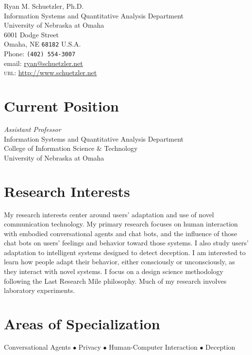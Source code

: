 \documentclass[10pt, letter]{article}
\begin{document}
{\LARGE Ryan M. Schuetzler, Ph.D.}\\[1cm]
 Information Systems and Quantitative Analysis Department\\
 University of Nebraska at Omaha\\
 6001 Dodge Street\\
 Omaha, NE \texttt{68182}
U.S.A.\\[.2cm]
Phone: \texttt{(402) 554-3007}\\[.2cm]
email: \href{mailto:ryan@schuetzler.net}{ryan@schuetzler.net}\\
\textsc{url}: \href{http://www.schuetzler.net}{http://www.schuetzler.net}\\

\section*{Current Position}
\emph{Assistant Professor}\\
Information Systems and Quantitative Analysis Department\\
College of Information Science \& Technology\\
University of Nebraska at Omaha


\section*{Research Interests}

My research interests center around users' adaptation and use of novel
communication technology. My primary research focuses on human interaction with
embodied conversational agents and chat bots, and the influence of those chat
bots on users' feelings and behavior toward those systems. I also study users'
adaptation to intelligent systems designed to detect deception. I am interested
to learn how people adapt their behavior, either consciously or unconsciously,
as they interact with novel systems. I focus on a design science methodology
following the Last Research Mile philosophy. Much of my research involves
laboratory experiments.

\section*{Areas of Specialization}
Conversational Agents $\bullet$
Privacy $\bullet$ Human-Computer Interaction $\bullet$ Deception
\end{document}
